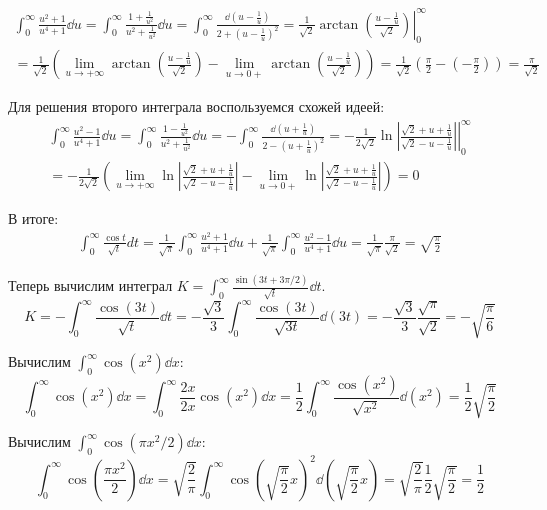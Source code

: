 \[
\begin{split}
  \int_{0}^{\infty} \frac{u^2 + 1}{u^4 + 1} \dd u
  = \int_{0}^{\infty} \frac{1 + \frac{1}{u^2}}{u^2 + \frac{1}{u^2}} \dd u
  = \int_{0}^{\infty}
  \frac{\dd \left(u - \frac{1}{u}\right)}{2 + {\left(u - \frac{1}{u}\right)}^2}
  = \frac{1}{\sqrt{2}} \left.
  \arctan \left(\frac{u - \frac{1}{u}}{\sqrt{2}}\right)
  \right\rvert_{0}^{\infty} \\
  = \frac{1}{\sqrt{2}} \left(
  \lim_{u \to +\infty} \arctan \left(\frac{u - \frac{1}{u}}{\sqrt{2}}\right)
  - \lim_{u \to 0+} \arctan \left(\frac{u - \frac{1}{u}}{\sqrt{2}}\right)
  \right)
  = \frac{1}{\sqrt{2}} \left( \frac{\pi}{2} - \left(-\frac{\pi}{2}\right)\right)
  = \frac{\pi}{\sqrt{2}}
\end{split}
\]

Для решения второго интеграла воспользуемся схожей идеей:
\[
\begin{split}
  \int_{0}^{\infty} \frac{u^2 - 1}{u^4 + 1} \dd u
  = \int_{0}^{\infty} \frac{1 - \frac{1}{u^2}}{u^2 + \frac{1}{u^2}} \dd u
  = -\int_{0}^{\infty}
  \frac{\dd \left(u + \frac{1}{u}\right)}{2 - {\left(u + \frac{1}{u}\right)}^2}
  = -\left.\frac{1}{2\sqrt{2}}\ln\left|\frac{\sqrt{2} + u + \frac{1}{u}}{\sqrt{2} - u - \frac{1}{u}}\right|\right\rvert_{0}^{\infty} \\
  = -\frac{1}{2\sqrt{2}} \left(
  \lim_{u \to +\infty} \ln\left|\frac{\sqrt{2} + u + \frac{1}{u}}{\sqrt{2} - u - \frac{1}{u}}\right|
  - \lim_{u \to 0+} \ln\left|\frac{\sqrt{2} + u + \frac{1}{u}}{\sqrt{2} - u - \frac{1}{u}}\right|
  \right) = 0
\end{split}
\]

В итоге:
\[
\begin{split}
  \int_{0}^{\infty} \frac{\cos t}{\sqrt{t}} dt
  = \frac{1}{\sqrt{\pi}} \int_{0}^{\infty} \frac{u^2 + 1}{u^4 + 1} \dd u
  + \frac{1}{\sqrt{\pi}} \int_{0}^{\infty} \frac{u^2 - 1}{u^4 + 1} \dd u
  = \frac{1}{\sqrt{\pi}} \frac{\pi}{\sqrt{2}} = \sqrt{\frac{\pi}{2}}
\end{split}
\]

Теперь вычислим интеграл
\(K = \int_{0}^{\infty} \frac{\sin(3t + 3\pi/2)}{\sqrt{t}} \dd t\).
\[
  K
  = -\int_{0}^{\infty} \frac{\cos(3t)}{\sqrt{t}} \dd t
  = -\frac{\sqrt{3}}{3} \int_{0}^{\infty} \frac{\cos(3t)}{\sqrt{3t}} \dd(3t)
  = -\frac{\sqrt{3}}{3} \frac{\sqrt{\pi}}{\sqrt{2}}
  = -\sqrt{\frac{\pi}{6}}
\]

Вычислим \(\int_{0}^{\infty} \cos(x^2) \dd x\):
\[
  \int_{0}^{\infty} \cos(x^2) \dd x
  = \int_{0}^{\infty} \frac{2x}{2x} \cos(x^2) \dd x
  = \frac{1}{2} \int_{0}^{\infty} \frac{\cos(x^2)}{\sqrt{x^2}} \dd (x^2)
  = \frac{1}{2} \sqrt{\frac{\pi}{2}}
\]

Вычислим \(\int_{0}^{\infty} \cos(\pi x^2 / 2) \dd x\):
\[
  \int_{0}^{\infty} \cos\left(\frac{\pi x^2}{2}\right) \dd x
  = \sqrt{\frac{2}{\pi}} \int_{0}^{\infty} \cos{\left(\sqrt{\frac{\pi}{2}} x\right)}^2
  \dd \left(\sqrt{\frac{\pi}{2}} x\right)
  = \sqrt{\frac{2}{\pi}} \frac{1}{2}\sqrt{\frac{\pi}{2}} = \frac{1}{2}
\]
